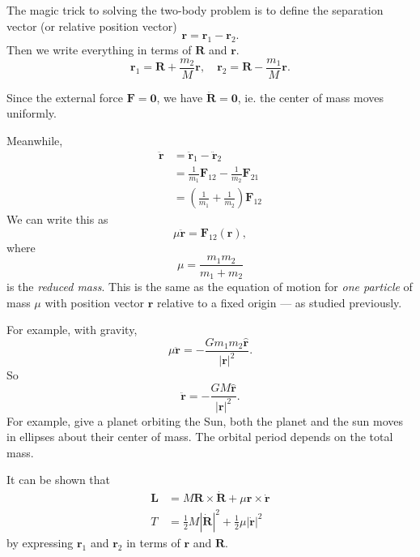 \documentclass[a4paper]{article}
\begin{document}
The magic trick to solving the two-body problem is to define the separation vector (or relative position vector)
\[
  \mathbf{r} = \mathbf{r}_1 - \mathbf{r}_2.
\]
Then we write everything in terms of $\mathbf{R}$ and $\mathbf{r}$.
\[
  \mathbf{r}_1 = \mathbf{R} + \frac{m_2}{M}\mathbf{r},\quad \mathbf{r}_2 = \mathbf{R} - \frac{m_1}{M}\mathbf{r}.
\]
\begin{center}
\end{center}
Since the external force $\mathbf{F} = \mathbf{0}$, we have $\ddot{\mathbf{R}} = \mathbf{0}$, ie. the center of mass moves uniformly.

Meanwhile,
\begin{align*}
  \ddot{\mathbf{r}} &= \ddot{\mathbf{r}}_1 - \ddot{\mathbf{r}}_2\\
  &= \frac{1}{m_1} \mathbf{F}_{12} - \frac{1}{m_2}\mathbf{F}_{21}\\
  &= \left(\frac{1}{m_1} + \frac{1}{m_2}\right) \mathbf{F}_{12}
\end{align*}
We can write this as
\[
  \mu \ddot{\mathbf{r}} = \mathbf{F}_{12}(\mathbf{r}),
\]
where
\[
  \mu = \frac{m_1m_2}{m_1 + m_2}
\]
is the \emph{reduced mass}. This is the same as the equation of motion for \emph{one particle} of mass $\mu$ with position vector $\mathbf{r}$ relative to a fixed origin --- as studied previously.

For example, with gravity,
\[
  \mu \ddot{\mathbf{r}} = -\frac{Gm_1m_2 \hat{\mathbf{r}}}{|\mathbf{r}|^2}.
\]
So
\[
  \ddot{\mathbf{r}} = -\frac{GM\hat{\mathbf{r}}}{|\mathbf{r}|^2}.
\]
For example, give a planet orbiting the Sun, both the planet and the sun moves in ellipses about their center of mass. The orbital period depends on the total mass.

It can be shown that
\begin{align*}
  \mathbf{L} &= M\mathbf{R} \times \dot{\mathbf{R}} + \mu \mathbf{r}\times \dot{\mathbf{r}}\\
  T &= \frac{1}{2} M|\dot{\mathbf{R}}|^2 + \frac{1}{2}\mu |\dot{\mathbf{r}}|^2
\end{align*}
by expressing $\mathbf{r}_1$ and $\mathbf{r}_2$ in terms of $\mathbf{r}$ and $\mathbf{R}$.
\end{document}
